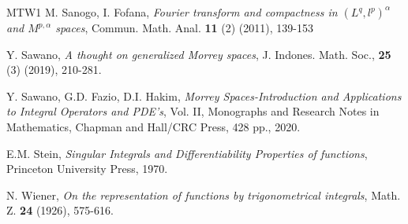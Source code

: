 \documentclass[a4paper,12pt,intlimits,oneside]{amsart}
\numberwithin{equation}{section}
\numberwithin{equation}{section}
\theoremstyle{definition}
\begin{document}
\begin{thebibliography}{MTW1}
 M. Sanogo, I. Fofana, \textit{Fourier transform and compactness in $ (L^q , l^p)^{\alpha}$ and $ M^{p,\alpha}$ spaces}, Commun. Math. Anal. \textbf{11} (2) (2011), 139-153

Y. Sawano, \textit{A thought on generalized Morrey spaces}, J. Indones. Math. Soc., \textbf{25} (3) (2019), 210-281.

 Y. Sawano, G.D. Fazio, D.I. Hakim, \textit{Morrey Spaces-Introduction and Applications
to Integral Operators and PDE’s}, Vol. II, Monographs and Research Notes in
Mathematics, Chapman and Hall/CRC Press, 428 pp., 2020.

E.M. Stein, \textit{Singular Integrals and Differentiability Properties of functions},
Princeton University Press, 1970.

 N. Wiener, \textit{On the representation of functions by trigonometrical integrals},  Math. Z. \textbf{24} (1926), 575-616.
\end{thebibliography}
\end{document}
